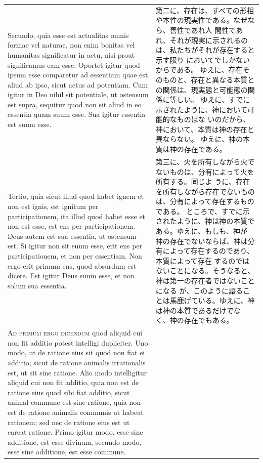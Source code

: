 \documentclass[paper=a4paper,fontsize=10pt,jafontsize=9pt,titlepage]{jlreq}
\begin{document}
\begin{longtable}{p{21em}p{21em}}
\\

Secundo, quia esse est actualitas omnis formae vel naturae, non enim
 bonitas vel humanitas significatur in actu, nisi prout significamus eam
 esse.
Oportet igitur quod ipsum esse comparetur ad essentiam quae est aliud ab
 ipso, sicut actus ad potentiam.
Cum igitur in Deo nihil sit potentiale, ut ostensum est supra, sequitur
 quod non sit aliud in eo essentia quam suum esse.
Sua igitur essentia est suum esse.

&


第二に、存在は、すべての形相や本性の現実性である。なぜなら、善性であれ人
 間性であれ、それが現実に示されるのは、私たちがそれが存在すると示す限り
 においてでしかないからである。
ゆえに、存在そのものと、存在と異なる本質との関係は、現実態と可能態の関
 係に等しい。
ゆえに、すでに示されたように、神において可能的なものはな
 いのだから、神において、本質は神の存在と異ならない。
ゆえに、神の本質は神の存在である。

\\


Tertio, quia sicut illud quod habet ignem et non est ignis, est ignitum
 per participationem, ita illud quod habet esse et non est esse, est ens
 per participationem.  Deus autem est sua essentia, ut ostensum est.  Si
 igitur non sit suum esse, erit ens per participationem, et non per
 essentiam.  Non ergo erit primum ens, quod absurdum est dicere.  Est
 igitur Deus suum esse, et non solum sua essentia.


&

第三に、火を所有しながら火でないものは、分有によって火を所有する。同じよ
うに、存在を所有しながら存在でないものは、分有によって存在するものである。
ところで、すでに示されたように、神は神の本質である。ゆえに、もしも、神が
神の存在でないならば、神は分有によって存在するのであり、本質によって存在
するのではないことになる。そうなると、神は第一の存在者ではないことになる
が、このように語ることは馬鹿げている。ゆえに、神は神の本質であるだけでな
く、神の存在でもある。


\\



\textsc{Ad primum ergo dicendum} quod aliquid cui non fit additio potest
 intelligi dupliciter.
Uno modo, ut de ratione eius sit quod non fiat ei additio; sicut de
 ratione animalis irrationalis est, ut sit sine ratione.
Alio modo intelligitur aliquid cui non fit additio, quia non est de
 ratione eius quod sibi fiat additio, sicut animal commune est sine
 ratione, quia non est de ratione animalis communis ut habeat rationem;
 sed nec de ratione eius est ut careat ratione.
Primo igitur modo, esse sine additione, est esse divinum, secundo modo,
 esse sine additione, est esse commune.


\end{longtable}
\end{document}
